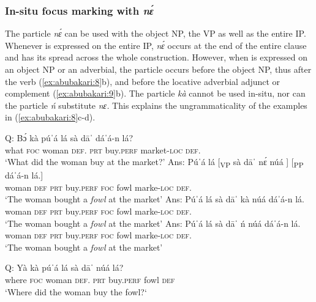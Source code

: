 \documentclass[output=paper,modfonts,nonflat,
\ChapterDOI{10.5281/zenodo.3367154}
 hidelinks
]{langsci/langscibook}
\begin{document}
\subsubsection{In-situ focus marking with \textit{nɛ́}}

The particle \textit{nɛ́} can be used with the object NP, the VP as well as the entire IP. Whenever  is expressed on the entire IP, \textit{nɛ́} occurs at the end of the entire clause and has its  spread across the whole construction. However, when  is expressed on an object NP or an adverbial, the particle occurs before the object NP, thus after the verb (\ref{ex:abubakari:8}b), and before the locative adverbial adjunct or complement (\ref{ex:abubakari:9}b).  The particle \textit{kà} cannot be used in-situ, nor can the particle \textit{ń} substitute \textit{nɛ.} This explains the ungrammaticality of the examples in (\ref{ex:abubakari:8}c-d).

 
\ea\label{ex:abubakari:8}
\ea \label{ex:abubakari:8a} 
Q: \gll Bɔ́  kà  púˈá    lá  sà  dāˈ  dáˈá-n  lá?\\   
      what  \textsc{foc}   woman  \textsc{def}.  \textsc{prt}  buy.\textsc{perf}     market-\textsc{loc}  \textsc{def}. \\
 \glt   ‘What did the woman buy at the market?’
\ex \label{ex:abubakari:8b} 
Ans: \gll  Púˈá  lá   [\textsubscript{VP} sà  dāˈ    nɛ́  núá ]  [{\textsubscript{PP}} dáˈá-n    lá.]\\ 
             woman  \textsc{def} {}  \textsc{prt}  buy.\textsc{perf}  \textsc{foc}  fowl  {} {}  marke-\textsc{loc}  \textsc{def}.\\
 \glt ‘The woman bought a \textit{fowl} at the market’
 \ex \label{ex:abubakari:8c} 
Ans:  \gll *Púˈá  lá  sà  dāˈ    kà  núá  dáˈá-n    lá. \\
woman  \textsc{def}  \textsc{prt}  buy.\textsc{perf}  \textsc{foc}  fowl   marke-\textsc{loc}  \textsc{def}. \\
\glt     ‘The woman bought a \textit{fowl} at the market’
 \ex \label{ex:abubakari:8d} 
Ans:  \gll *Púˈá    lá     sà  dāˈ    ń  núá dáˈá-n  lá.\\
woman  \textsc{def}  \textsc{prt}  buy.\textsc{perf}  \textsc{foc}  fowl marke-\textsc{loc}   \textsc{def}. \\
\glt ‘The woman bought a \textit{fowl} at the market’
\z
\z
 
\ea\label{ex:abubakari:9}
\ea \label{ex:abubakari:9a} 
Q: \gll Yà  kà   púˈá    lá  sà  dāˈ                                                     núá  lá?\\
where  \textsc{foc}  woman  \textsc{def}.  \textsc{prt}  buy.\textsc{perf} fowl  \textsc{def}\\
\glt ‘Where did the woman buy the fowl?‘
 
\end{document}
